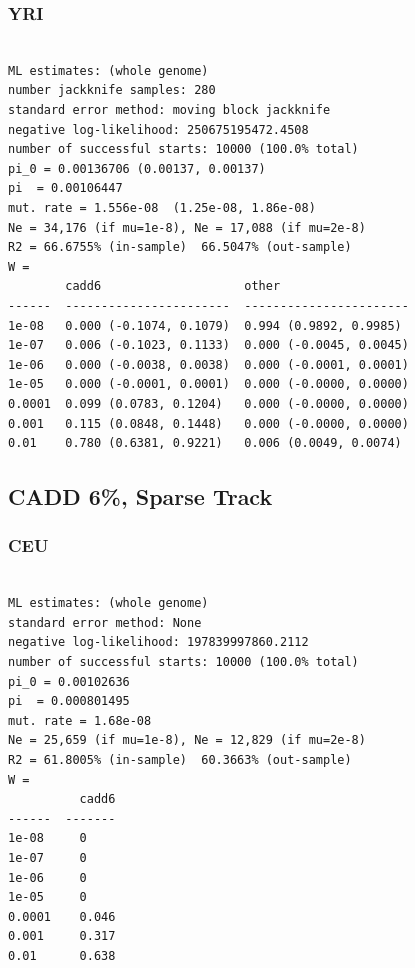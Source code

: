 \documentclass[11pt]{article}
\begin{document}
\subsubsection*{YRI}
\begin{minipage}{\linewidth}\begin{footnotesize}
\begin{verbatim}

ML estimates: (whole genome)
number jackknife samples: 280
standard error method: moving block jackknife
negative log-likelihood: 250675195472.4508
number of successful starts: 10000 (100.0% total)
pi_0 = 0.00136706 (0.00137, 0.00137)
pi  = 0.00106447
mut. rate = 1.556e-08  (1.25e-08, 1.86e-08)
Ne = 34,176 (if mu=1e-8), Ne = 17,088 (if mu=2e-8)
R2 = 66.6755% (in-sample)  66.5047% (out-sample)
W = 
        cadd6                    other
------  -----------------------  -----------------------
1e-08   0.000 (-0.1074, 0.1079)  0.994 (0.9892, 0.9985)
1e-07   0.006 (-0.1023, 0.1133)  0.000 (-0.0045, 0.0045)
1e-06   0.000 (-0.0038, 0.0038)  0.000 (-0.0001, 0.0001)
1e-05   0.000 (-0.0001, 0.0001)  0.000 (-0.0000, 0.0000)
0.0001  0.099 (0.0783, 0.1204)   0.000 (-0.0000, 0.0000)
0.001   0.115 (0.0848, 0.1448)   0.000 (-0.0000, 0.0000)
0.01    0.780 (0.6381, 0.9221)   0.006 (0.0049, 0.0074)
\end{verbatim}
\end{footnotesize}\end{minipage}


\subsection{CADD 6\%, Sparse Track}
\subsubsection*{CEU}
\begin{minipage}{\linewidth}\begin{footnotesize}
\begin{verbatim}

ML estimates: (whole genome)
standard error method: None
negative log-likelihood: 197839997860.2112
number of successful starts: 10000 (100.0% total)
pi_0 = 0.00102636
pi  = 0.000801495
mut. rate = 1.68e-08 
Ne = 25,659 (if mu=1e-8), Ne = 12,829 (if mu=2e-8)
R2 = 61.8005% (in-sample)  60.3663% (out-sample)
W = 
          cadd6
------  -------
1e-08     0
1e-07     0
1e-06     0
1e-05     0
0.0001    0.046
0.001     0.317
0.01      0.638
\end{verbatim}
\end{footnotesize}\end{minipage}
\end{document}
